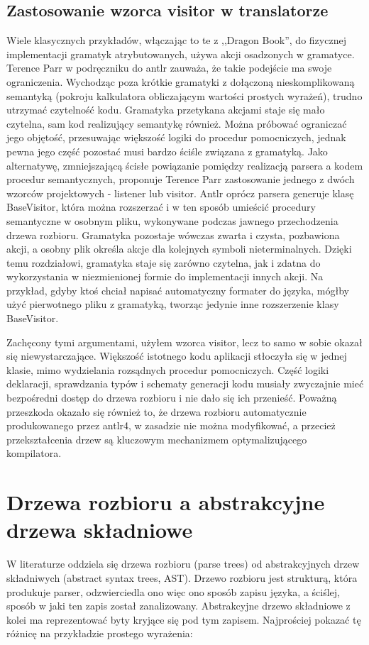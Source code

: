 \subsection{Zastosowanie wzorca visitor w translatorze}
Wiele klasycznych przykładów, włączając to te z ,,Dragon Book''\cite{DRAGON_BOOK}, do fizycznej implementacji gramatyk atrybutowanych, używa akcji osadzonych w gramatyce. Terence Parr w podręczniku do antlr\cite{Definitive_antlr_reference} zauważa, że takie podejście ma swoje ograniczenia. Wychodząc poza krótkie gramatyki z dołączoną nieskomplikowaną semantyką (pokroju kalkulatora obliczającym wartości prostych wyrażeń), trudno utrzymać czytelność kodu. Gramatyka przetykana akcjami staje się mało czytelna, sam kod realizujący semantykę również. Można próbować ograniczać jego objętość, przesuwając większość logiki do procedur pomocniczych, jednak pewna jego część pozostać musi bardzo ściśle związana z gramatyką. Jako alternatywę, zmniejszającą ścisłe powiązanie pomiędzy realizacją parsera a kodem procedur semantycznych, proponuje Terence Parr zastosowanie jednego z dwóch wzorców projektowych - listener lub visitor. Antlr oprócz parsera generuje klasę BaseVisitor, która można rozszerzać i w ten sposób umieścić procedury semantyczne w osobnym pliku, wykonywane podczas jawnego przechodzenia drzewa rozbioru. Gramatyka pozostaje wówczas zwarta i czysta, pozbawiona akcji, a osobny plik określa akcje dla kolejnych symboli nieterminalnych. Dzięki temu rozdziałowi, gramatyka staje się zarówno czytelna, jak i zdatna do wykorzystania w niezmienionej formie do implementacji innych akcji. Na przykład, gdyby ktoś chciał napisać automatyczny formater do języka, mógłby użyć pierwotnego pliku z gramatyką, tworząc jedynie inne rozszerzenie klasy BaseVisitor.

Zachęcony tymi argumentami, użyłem wzorca visitor, lecz to samo w sobie okazał się niewystarczające. Większość istotnego kodu aplikacji stłoczyła się w jednej klasie, mimo wydzielania rozsądnych procedur pomocniczych. Część logiki deklaracji, sprawdzania typów i schematy generacji kodu musiały zwyczajnie mieć bezpośredni dostęp do drzewa rozbioru i nie dało się ich przenieść. Poważną przeszkoda okazało się również to, że drzewa rozbioru automatycznie produkowanego przez antlr4, w zasadzie nie można modyfikować, a przecież przekształcenia drzew są kluczowym mechanizmem optymalizującego kompilatora.

\section{Drzewa rozbioru a abstrakcyjne drzewa składniowe}
W literaturze oddziela się drzewa rozbioru (parse trees) od abstrakcyjnych drzew składniwych (abstract syntax trees, AST)\cite{DRAGON_BOOK}. Drzewo rozbioru jest strukturą, która produkuje parser, odzwierciedla ono więc ono sposób zapisu języka, a ściślej, sposób w jaki ten zapis został zanalizowany. Abstrakcyjne drzewo składniowe z kolei ma reprezentować byty kryjące się pod tym zapisem. Najprościej pokazać tę różnicę na przykładzie prostego wyrażenia:

